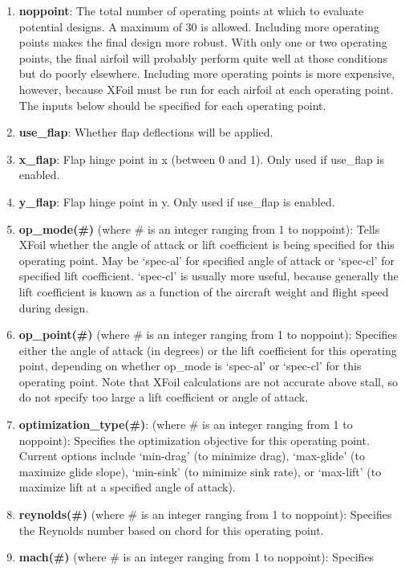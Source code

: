 \documentclass[11pt]{article}
\begin{document}
\begin{enumerate}
\item{\textbf{noppoint}: The total number of operating points at which to evaluate
potential designs.  A maximum of 30 is allowed.  Including more operating points makes the
final design more robust.  With only one or two operating points, the final airfoil will
probably perform quite well at those conditions but do poorly elsewhere.  Including more
operating points is more expensive, however, because XFoil must be run for each airfoil at
each operating point.  The inputs below should be specified for each operating point.}
\item{\textbf{use\_flap}: Whether flap deflections will be applied.}
\item{\textbf{x\_flap}: Flap hinge point in x (between 0 and 1). Only used if use\_flap is
enabled.}
\item{\textbf{y\_flap}: Flap hinge point in y. Only used if use\_flap is enabled.}
\item{\textbf{op\_mode(\#)} (where \# is an integer ranging from 1 to noppoint): Tells
XFoil whether the angle of attack or lift coefficient is being specified for this
operating point.  May be `spec-al' for specified angle of attack or `spec-cl' for
specified lift coefficient. `spec-cl' is usually more useful, because generally the lift
coefficient is known as a function of the aircraft weight and flight speed during design.}
\item{\textbf{op\_point(\#)} (where \# is an integer ranging from 1 to noppoint):
Specifies either the angle of attack (in degrees) or the lift coefficient for this
operating point, depending on whether op\_mode is `spec-al' or `spec-cl' for this
operating point.  Note that XFoil calculations are not accurate above stall, so do not
specify too large a lift coefficient or angle of attack.}
\item{\textbf{optimization\_type(\#)}: (where \# is an integer ranging from 1 to
noppoint): Specifies the optimization objective for this operating point. Current options 
include `min-drag' (to minimize drag), `max-glide' (to maximize 
glide slope), `min-sink' (to minimize sink rate), or `max-lift' (to maximize lift at a
specified angle of attack).}
\item{\textbf{reynolds(\#)} (where \# is an integer ranging from 1 to noppoint): Specifies
the Reynolds number based on chord for this operating point.}
\item{\textbf{mach(\#)} (where \# is an integer ranging from 1 to noppoint): Specifies
}
\end{enumerate}
\end{document}
